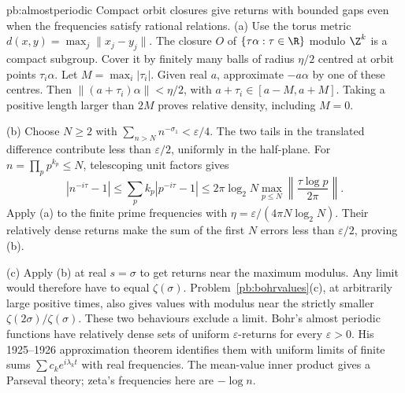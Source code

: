 \begin{solution}{pb:almostperiodic}
\idea Compact orbit closures give returns with bounded gaps even when the frequencies satisfy rational relations.
\writeup (a) Use the torus metric $d(x,y)=\max_j\|x_j-y_j\|$. The closure $O$ of $\{\tau\alpha:\tau\in\R\}$ modulo $\Z^k$ is a compact subgroup. Cover it by finitely many balls of radius $\eta/2$ centred at orbit points $\tau_i\alpha$. Let $M=\max_i|\tau_i|$. Given real $a$, approximate $-a\alpha$ by one of these centres. Then $\|(a+\tau_i)\alpha\|<\eta/2$, with $a+\tau_i\in[a-M,a+M]$. Taking a positive length larger than $2M$ proves relative density, including $M=0$.

(b) Choose $N\ge2$ with $\sum_{n>N}n^{-\sigma_1}<\varepsilon/4$. The two tails in the translated difference contribute less than $\varepsilon/2$, uniformly in the half-plane. For $n=\prod_pp^{k_p}\le N$, telescoping unit factors gives
\[|n^{-i\tau}-1|\le\sum_pk_p|p^{-i\tau}-1|
 \le2\pi\log_2N\max_{p\le N}\left\|\frac{\tau\log p}{2\pi}\right\|.
\]
Apply (a) to the finite prime frequencies with $\eta=\varepsilon/(4\pi N\log_2N)$. Their relatively dense returns make the sum of the first $N$ errors less than $\varepsilon/2$, proving (b).

(c) Apply (b) at real $s=\sigma$ to get returns near the maximum modulus. Any limit would therefore have to equal $\zeta(\sigma)$. Problem~\ref{pb:bohrvalues}(c), at arbitrarily large positive times, also gives values with modulus near the strictly smaller $\zeta(2\sigma)/\zeta(\sigma)$. These two behaviours exclude a limit.
\leads Bohr's almost periodic functions have relatively dense sets of uniform $\varepsilon$-returns for every $\varepsilon>0$. His 1925--1926 approximation theorem identifies them with uniform limits of finite sums $\sum c_ke^{i\lambda_kt}$ with real frequencies. The mean-value inner product gives a Parseval theory; zeta's frequencies here are $-\log n$.
\end{solution}

